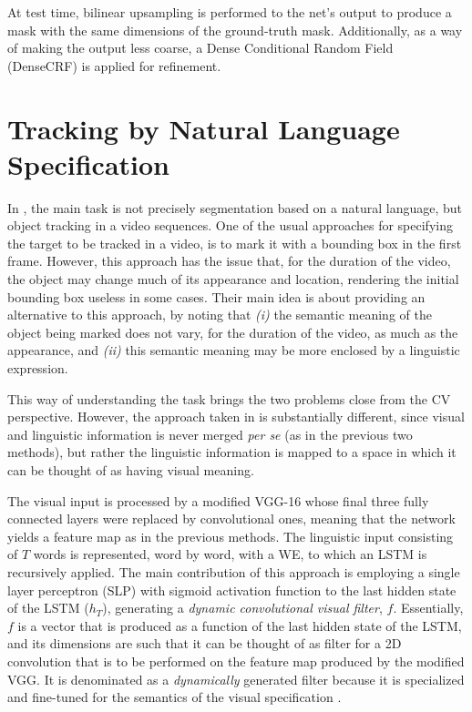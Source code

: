 At test time, bilinear upsampling is performed to the net's output to produce a mask with the same dimensions of the ground-truth mask. Additionally, as a way of making the output less coarse, a Dense Conditional Random Field (DenseCRF) \cite{DBLP:journals/corr/abs-1210-5644} is applied for refinement.


\section{Tracking by Natural Language Specification}
In \cite{li2017cvpr}, the main task is not precisely segmentation based on a natural language, but object tracking in a video sequences. One of the usual approaches for specifying the target to be tracked in a video, is to mark it with a bounding box in the first frame. However, this approach has the issue that, for the duration of the video, the object may change much of its appearance and location, rendering the initial bounding box useless in some cases. Their main idea is about providing an alternative to this approach, by noting that \textit{(i)} the semantic meaning of the object being marked does not vary, for the duration of the video, as much as the appearance, and \textit{(ii)} this semantic meaning may be more enclosed by a linguistic expression.

This way of understanding the task brings the two problems close from the CV perspective. However, the approach taken in \cite{li2017cvpr} is substantially different, since visual and linguistic information is never merged \textit{per se} (as in the previous two methods), but rather the linguistic information is mapped to a space in which it can be thought of as having visual meaning.

The visual input is processed by a modified VGG-16 whose final three fully connected layers were replaced by convolutional ones, meaning that the network yields a feature map as in the previous methods. The linguistic input consisting of $T$ words is represented, word by word, with a WE, to which an LSTM is recursively applied. The main contribution of this approach is employing a single layer perceptron (SLP) with sigmoid activation function to the last hidden state of the LSTM ($h_T$), generating a \textit{dynamic convolutional visual filter}, $f$. Essentially, $f$ is a vector that is produced as a function of the last hidden state of the LSTM, and its dimensions are such that it can be thought of as filter for a 2D convolution that is to be performed on the feature map produced by the modified VGG. It is denominated as a \textit{dynamically} generated filter because it is specialized and fine-tuned for the semantics of the visual specification \cite{li2017cvpr}. 

